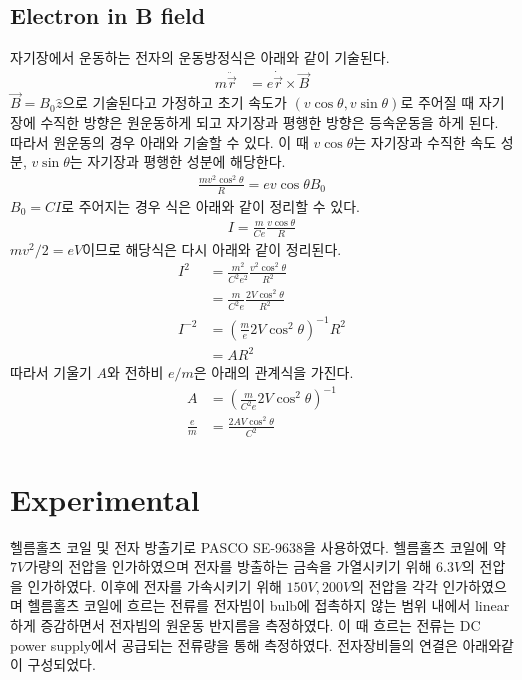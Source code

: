 \documentclass[%
 reprint,
 amsmath,amssymb,
 aps,
]{revtex4-2}
\begin{document}
\subsection{\label{sec:level2}Electron in B field}
자기장에서 운동하는 전자의 운동방정식은 아래와 같이 기술된다.
\begin{align}
	m\ddot{\vec{r}} &= e\dot{\vec{r}} \times \vec{B}
\end{align}
$\vec{B} = B_{0} \hat{z}$으로 기술된다고 가정하고 초기 속도가 $(v\cos\theta , v\sin\theta)$로 주어질 때 자기장에 수직한 방향은 원운동하게 되고 자기장과 평행한 방향은 등속운동을 하게 된다. 따라서 원운동의 경우 아래와 기술할 수 있다. 이 때 $v\cos\theta$는 자기장과 수직한 속도 성분, $v\sin\theta$는 자기장과 평행한 성분에 해당한다.
\begin{align}
	\frac{mv^{2}\cos^{2}\theta}{R} = ev\cos\theta B_{0}
\end{align}
$B_{0} = CI$로 주어지는 경우 식은 아래와 같이 정리할 수 있다.
\begin{align}
	I = \frac{m}{Ce}\frac{v\cos\theta}{R}
\end{align}
$mv^{2}/2 = eV$이므로 해당식은 다시 아래와 같이 정리된다.
\begin{align}
	I^{2} &= \frac{m^{2}}{C^{2}e^{2}}\frac{v^{2}\cos^{2}\theta}{R^{2}}\\
	&= \frac{m}{C^{2}e}\frac{2V\cos^{2}\theta}{R^{2}}\\
	I^{-2} &= \left(\frac{m}{e}2V\cos^{2}\theta\right)^{-1}R^{2}\\
	&= AR^{2}
\end{align}
따라서 기울기 $A$와 전하비 $e/m$은 아래의 관계식을 가진다.
\begin{align}
	A &= \left(\frac{m}{C^{2}e}2V\cos^{2}\theta\right)^{-1}\\
	\frac{e}{m} &= \frac{2AV\cos^{2}\theta}{C^{2}}
\end{align}

\section{\label{sec:level1}Experimental}
헬름홀츠 코일 및 전자 방출기로 PASCO SE-9638을 사용하였다. 헬름홀츠 코일에 약 $7V$가량의 전압을 인가하였으며 전자를 방출하는 금속을 가열시키기 위해 $6.3V$의 전압을 인가하였다. 이후에 전자를 가속시키기 위해 $150V, 200V$의 전압을 각각 인가하였으며 헬름홀츠 코일에 흐르는 전류를 전자빔이 bulb에 접촉하지 않는 범위 내에서 linear하게 증감하면서 전자빔의 원운동 반지름을 측정하였다. 이 때 흐르는 전류는 DC power supply에서 공급되는 전류량을 통해 측정하였다. 전자장비들의 연결은 아래와같이 구성되었다.
\end{document}

